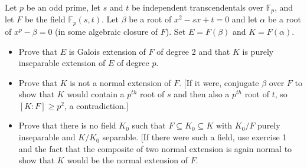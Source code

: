 \documentclass[11pt]{article}
\newenvironment{problem}[2][Problem\!]{\begin{tcolorbox}\begin{trivlist}
\item[\hskip \labelsep {\bfseries #1}\hskip \labelsep {\bfseries #2}]}{\end{trivlist}\end{tcolorbox}}
\newcommand{\ff}{\mathbb F}   %
\renewcommand{\geq}{\geqslant}
\begin{document}
\begin{problem} {14.9.3}
    Let $p$ be an odd prime, let $s$ and $t$ be independent transcendentals over $\ff_p$, and let $F$ be the field $\ff_p(s,t)$. Let $\beta$ be a root of $x^{2} -sx + t = 0$ and let $\alpha$ be a root of $x^{p} - \beta = 0$ (in some algebraic closure of $F$). Set $E = F(\beta)$ and $K = F(\alpha)$.
    \begin{itemize}
        \item[(a)] Prove that $E$ is Galois extension of $F$ of degree 2 and that $K$ is purely inseparable extension of $E$ of degree $p$. 
        \item[(b)] Prove that $K$ is not a normal extension of $F$. [If it were, conjugate $\beta$ over $F$ to show that $K$ would contain a $p^{th}$ root of $s$ and then also a $p^{th}$ root of $t$, so $[K:F]\geq p^{2}$, a contradiction.]
        \item[(c)]  Prove that there is no field $K_0$ such that $F\subseteq K_0 \subseteq K$ with $K_0/F$ purely inseparable and $K/K_0$ separable. [If there were such a field, use exercise 1 and the fact that the composite of two normal extension is again normal to show that $K$ would be the normal extension of $F$. 
    \end{itemize}
\end{problem}
\end{document}

